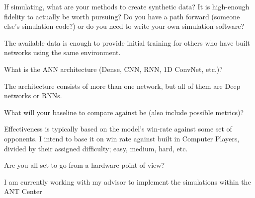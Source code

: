\documentclass[12pt,letterpaper]{exam}
\begin{document}
\begin{questions}
	\question 
	If simulating, what are your methods to create synthetic data? 
	It is high-enough fidelity to actually be worth pursuing? 
	Do you have a path forward (someone else’s simulation code?) or do you need to write your own simulation software?
	\begin{solution}
		The available data is enough to provide initial training for others who have built networks using the same environment.
	\end{solution}

	\question 
	What is the ANN architecture (Dense, CNN, RNN, 1D ConvNet, etc.)?
	\begin{solution}
		The architecture consists of more than one network, but all of them are Deep networks or RNNs.
	\end{solution}
	
	\question 
	What will your baseline to compare against be (also include possible metrics)?
	\begin{solution}
		Effectiveness is typically based on the model's win-rate against some set of opponents.
		I intend to base it on win rate against built in Computer Players, divided by their assigned difficulty; easy, medium, hard, etc.
	\end{solution}
	
	\question 
	Are you all set to go from a hardware point of view?
	\begin{solution}
		I am currently working with my advisor to implement the simulations within the ANT Center
	\end{solution}
	
\end{questions}
\end{document}

